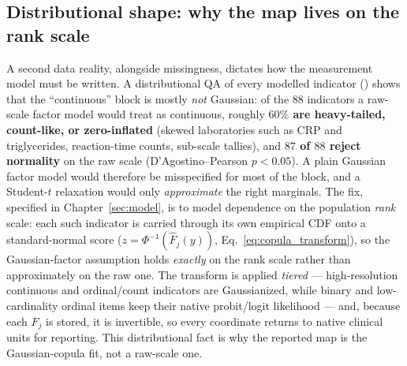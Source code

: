 \subsection{Distributional shape: why the map lives on the rank scale}
\label{sub:distqa}
A second data reality, alongside missingness, dictates how the measurement model must be written. A
distributional QA of every modelled indicator () shows that the
``continuous'' block is mostly \emph{not} Gaussian: of the $88$ indicators a raw-scale factor model would treat
as continuous, roughly \textbf{$60\%$ are heavy-tailed, count-like, or zero-inflated} (skewed laboratories such
as CRP and triglycerides, reaction-time counts, sub-scale tallies), and \textbf{$87$ of $88$ reject normality}
on the raw scale (D'Agostino--Pearson $p<0.05$). A plain Gaussian factor model would therefore be misspecified
for most of the block, and a Student-$t$ relaxation would only \emph{approximate} the right marginals. The fix,
specified in Chapter~\ref{sec:model}, is to model dependence on the population \emph{rank} scale: each such
indicator is carried through its own empirical CDF onto a standard-normal score
($z=\Phi^{-1}(\widehat F_j(y))$, Eq.~\eqref{eq:copula_transform}), so the Gaussian-factor assumption holds
\emph{exactly} on the rank scale rather than approximately on the raw one. The transform is applied
\emph{tiered} --- high-resolution continuous and ordinal/count indicators are Gaussianized, while binary and
low-cardinality ordinal items keep their native probit/logit likelihood --- and, because each $\widehat F_j$ is
stored, it is invertible, so every coordinate returns to native clinical units for reporting. This distributional
fact is why the reported map is the Gaussian-copula fit, not a raw-scale one.

